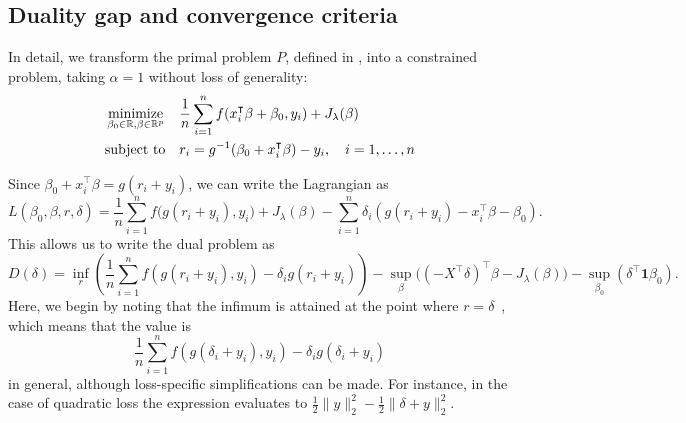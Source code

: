 \documentclass[article]{jss}
\let\Cref\crtCref
\begin{document}
\begin{appendix}

  \section{Duality gap and convergence criteria}
  \label{sec:convergence-criteria-details}

  In detail, we transform the primal problem \(P\), defined in \Cref{eq:slope}, into a
  constrained problem, taking \(\alpha = 1\) without loss of generality:
  \begin{equation}
    \label{eq:slope-constrained}
    \begin{aligned}
       & \operatorname*{minimize}_{\beta_0 \in \mathbb{R},\beta \in \mathbb{R}^p} &  & \frac{1}{n} \sum_{i=1}^n f(x_i^\intercal \beta + \beta_0, y_i) + J_{\lambda}(\beta) \\
       & \text{subject to}                                         &  & r_i = g^{-1}(\beta_0 + x_i^\intercal \beta) - y_i, \quad i = 1, \ldots, n           \\
    \end{aligned}
  \end{equation}

  Since \(\beta_0 + x_i^\intercal \beta = g(r_i + y_i)\), we can write the Lagrangian as
  \[
    L(\beta_0,\beta,r,\delta) = \frac{1}{n} \sum_{i=1}^n f\big(g(r_i + y_i), y_i\big) + J_{\lambda}(\beta) - \sum_{i=1}^n \delta_i \left(g(r_i + y_i) - x_i^\intercal \beta - \beta_0 \right).
  \]
  This allows us to write the dual problem as
  \[
    D(\delta)  = \inf_r\left( \frac{1}{n} \sum_{i=1}^n f\left(g(r_i+y_i), y_i\right) - \delta_i g(r_i+ y_i)\right)
    - \sup_\beta \big((-X^\intercal \delta)^\intercal \beta -  J_\lambda(\beta) \big)
    - \sup_{\beta_0} \left( \delta^\intercal \bm{1} \beta_0\right).
  \]
  Here, we begin by noting that the infimum is attained at the point where
  \(r = \delta\)~\citep{fercoq2015}, which means that the value is
  \[
    \frac{1}{n} \sum_{i=1}^n f\left(g(\delta_i+y_i), y_i\right) - \delta_i g(\delta_i + y_i)
  \]
  in general, although loss-specific simplifications can be made. For instance, in the case of
  quadratic loss the expression evaluates to \(\frac{1}{2} \lVert y \rVert_2^2 - \frac{1}{2} \lVert \delta + y \lVert^2_2 \).


\end{appendix}
\end{document}
